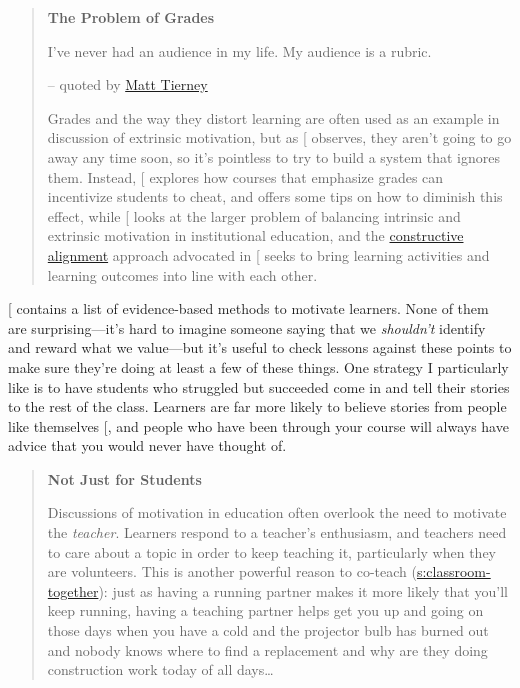 \begin{quote}\setlength{\parindent}{0pt}
\textbf{The Problem of Grades}

I've never had an audience in my life. My audience is a rubric.

-- quoted by \href{https://twitter.com/figuralities/status/987330064571387906}{Matt Tierney}

Grades and the way they distort learning are often used as an
example in discussion of extrinsic motivation, but as
{[}\protect[\hyperlink{b:Mill2016a}{Mill2016a}]{]} observes, they aren't going to go away any time
soon, so it's pointless to try to build a system that ignores
them. Instead, {[}\protect[\hyperlink{b:Lang2013}{Lang2013}]{]} explores how courses that
emphasize grades can incentivize students to cheat, and offers some
tips on how to diminish this effect, while {[}\protect[\hyperlink{b:Covi2017}{Covi2017}]{]} looks
at the larger problem of balancing intrinsic and extrinsic
motivation in institutional education, and the \href{https://en.wikipedia.org/wiki/Constructive_alignment}{constructive
alignment} approach advocated in
{[}\protect[\hyperlink{b:Bigg2011}{Bigg2011}]{]} seeks to bring learning activities and learning
outcomes into line with each other.
\end{quote}

{[}\protect[\hyperlink{b:Ambr2010}{Ambr2010}]{]} contains a list of evidence-based methods to motivate
learners. None of them are surprising---it's hard to imagine someone
saying that we \emph{shouldn't} identify and reward what we value---but it's
useful to check lessons against these points to make sure they're doing
at least a few of these things. One strategy I particularly like is to
have students who struggled but succeeded come in and tell their stories
to the rest of the class. Learners are far more likely to believe
stories from people like themselves {[}\protect[\hyperlink{b:Mill2016a}{Mill2016a}]{]}, and people who
have been through your course will always have advice that you would
never have thought of.

\begin{quote}\setlength{\parindent}{0pt}
\textbf{Not Just for Students}

Discussions of motivation in education often overlook the need to
motivate the \emph{teacher}. Learners respond to a teacher's enthusiasm,
and teachers need to care about a topic in order to keep teaching it,
particularly when they are volunteers. This is another powerful reason
to co-teach (\protect\hyperlink{SECTION}{s:classroom-together}): just as having a
running partner makes it more likely that you'll keep running, having
a teaching partner helps get you up and going on those days when you
have a cold and the projector bulb has burned out and nobody knows
where to find a replacement and why are they doing construction work
today of all days\ldots{}
\end{quote}

